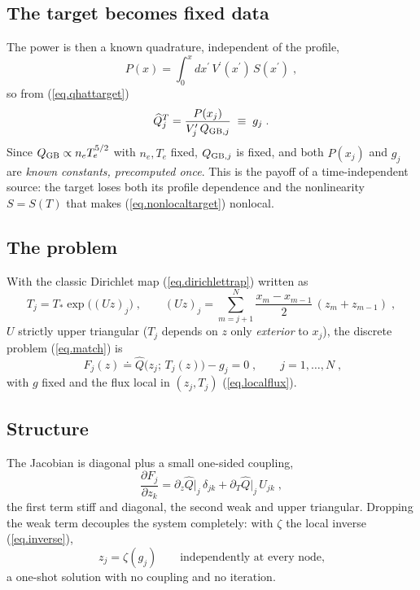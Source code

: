 \documentclass[12pt]{article}
\newcommand\qgb{Q_{\rm GB}}
\newcommand\qgbj{Q_{{\rm GB},j}}
\newcommand\vpr{V^\prime}
\newcommand\qhat{\widehat{Q}}
\begin{document}
\subsection{The target becomes fixed data}

The power is then a known quadrature, independent of the profile,
%
\begin{equation}
P(x) = \int_0^x dx^\prime \, \vpr(x^\prime) \, S(x^\prime) \; ,
\end{equation}
%
so from (\ref{eq.qhattarget})
%
\begin{equation}
\qhat^T_j = \frac{P(x_j)}{\vpr_j \, \qgbj} \;\equiv\; g_j \; .
\label{eq.gj}
\end{equation}
%
Since $\qgb \propto n_e T_e^{5/2}$ with $n_e,T_e$ fixed, $\qgbj$ is fixed,
and both $P(x_j)$ and $g_j$ are \emph{known constants, precomputed once}.
This is the payoff of a time-independent source: the target loses both
its profile dependence and the nonlinearity $S = S(T)$ that makes
(\ref{eq.nonlocaltarget}) nonlocal.

\subsection{The problem}

With the classic Dirichlet map (\ref{eq.dirichlettrap}) written as
%
\begin{equation}
T_j = T_* \exp\bigl( (Uz)_j \bigr) \; ,
\qquad
(Uz)_j = \sum_{m=j+1}^{N} \frac{x_m - x_{m-1}}{2} \, (z_m + z_{m-1}) \; ,
\label{eq.Umap}
\end{equation}
%
$U$ strictly upper triangular ($T_j$ depends on $z$ only \emph{exterior}
to $x_j$), the discrete problem (\ref{eq.match}) is
%
\begin{equation}
\boxed{\;
F_j(z) \doteq \qhat\bigl( z_j ;\, T_j(z) \bigr) - g_j = 0 \; ,
\qquad j = 1,\dots,N \; , }
\label{eq.constF}
\end{equation}
%
with $g$ fixed and the flux local in $(z_j,T_j)$ (\ref{eq.localflux}).

\subsection{Structure}

The Jacobian is diagonal plus a small one-sided coupling,
%
\begin{equation}
\frac{\partial F_j}{\partial z_k}
 = \partial_z \qhat \big|_j \, \delta_{jk}
 + \partial_T \qhat \big|_j \, U_{jk} \; ,
\end{equation}
%
the first term stiff and diagonal, the second weak and upper triangular.
Dropping the weak term decouples the system completely: with $\zeta$ the
local inverse (\ref{eq.inverse}),
%
\begin{equation}
z_j = \zeta(g_j) \qquad \text{independently at every node,}
\end{equation}
%
a one-shot solution with no coupling and no iteration.
\end{document}
